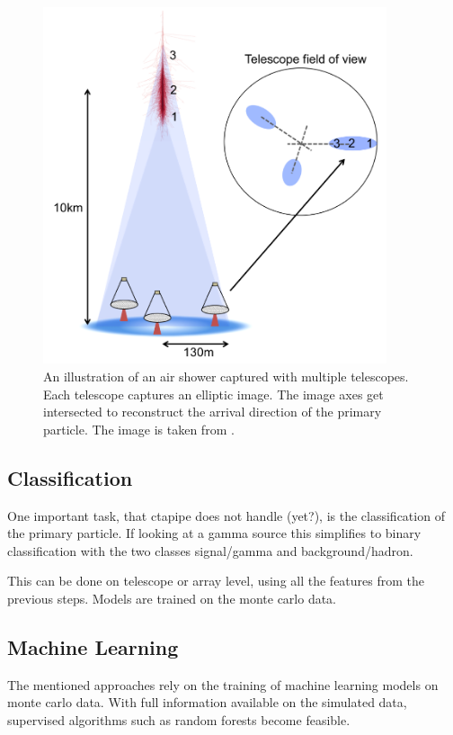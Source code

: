 \begin{figure}
	\centering
	\captionsetup{width=0.9\linewidth}
	\hspace*{0.1\textwidth}\includegraphics[width=0.9\textwidth]{images/stereo_shower.png}
	\caption{An illustration of an air shower captured with multiple telescopes.
		Each telescope captures an elliptic image.
		The image axes get intersected to reconstruct the arrival direction
		of the primary particle.
	    The image is taken from \cite{2015arXiv151005675H}.}
	\label{fig:stereo_shower}
\end{figure}

\subsection{Classification}
One important task, that ctapipe does not handle (yet?), is the classification of
the primary particle. If looking at a gamma source this simplifies
to binary classification with the two classes signal/gamma and background/hadron.

This can be done on telescope or array level, using all the features from the previous
steps. Models are trained on the monte carlo data.

\subsection{Machine Learning}
The mentioned approaches rely on the training of machine learning models on
monte carlo data.
With full information available on the simulated data, supervised
algorithms such as random forests become feasible.

